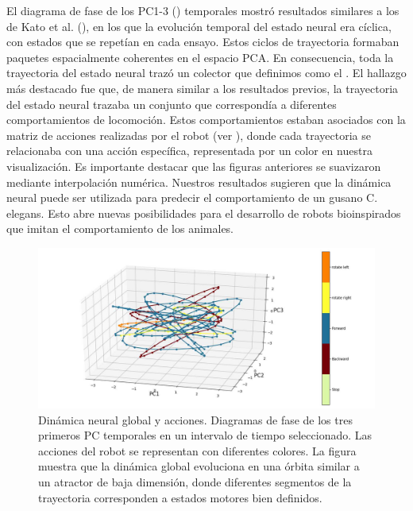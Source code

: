 El diagrama de fase de los PC1-3 () temporales mostró resultados similares a los de Kato et al. (), en los que la evolución temporal del estado neural era cíclica, con estados que se repetían en cada ensayo. Estos ciclos de trayectoria formaban paquetes espacialmente coherentes en el espacio PCA. En consecuencia, toda la trayectoria del estado neural trazó un colector que definimos como el .  El hallazgo más destacado fue que, de manera similar a los resultados previos, la trayectoria del estado neural trazaba un conjunto que correspondía a diferentes comportamientos de locomoción. Estos comportamientos estaban asociados con la matriz de acciones realizadas por el robot (ver ), donde cada trayectoria se relacionaba con una acción específica, representada por un color en nuestra visualización. Es importante destacar que las figuras anteriores se suavizaron mediante interpolación numérica. Nuestros resultados sugieren que la dinámica neural puede ser utilizada para predecir el comportamiento de un gusano C. elegans. Esto abre nuevas posibilidades para el desarrollo de robots bioinspirados que imitan el comportamiento de los animales.


 \begin{figure}[h!]
	\centering\includegraphics[width=\imsize]{PCs.png}
	\caption[ Dinámica neural global y acciones. Diagramas de fase de los tres primeros PC temporales en un intervalo de tiempo seleccionado.  ]{Dinámica neural global y acciones. Diagramas de fase de los tres primeros PC temporales en un intervalo de tiempo seleccionado. Las acciones del robot se representan con diferentes colores. La figura muestra que la dinámica global evoluciona en una órbita similar a un atractor de baja dimensión, donde diferentes segmentos de la trayectoria corresponden a estados motores bien definidos.}\label{fig:colector}
\end{figure}


